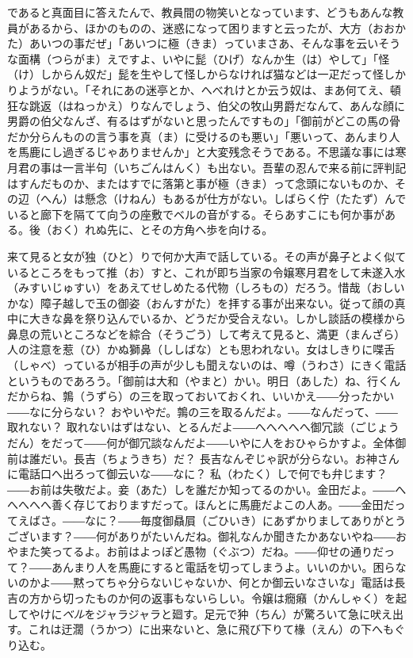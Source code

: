 \documentclass{book}
\begin{document}
であると真面目に答えたんで、教員間の物笑いとなっています、どうもあんな教員があるから、ほかのものの、迷惑になって困りますと云ったが、大方（おおかた）あいつの事だぜ」「あいつに極（きま）っていまさあ、そんな事を云いそうな面構（つらがま）えですよ、いやに髭（ひげ）なんか生（は）やして」「怪（け）しからん奴だ」髭を生やして怪しからなければ猫などは一疋だって怪しかりようがない。「それにあの迷亭とか、へべれけとか云う奴は、まあ何てえ、頓狂な跳返（はねっかえ）りなんでしょう、伯父の牧山男爵だなんて、あんな顔に男爵の伯父なんざ、有るはずがないと思ったんですもの」「御前がどこの馬の骨だか分らんものの言う事を真（ま）に受けるのも悪い」「悪いって、あんまり人を馬鹿にし過ぎるじゃありませんか」と大変残念そうである。不思議な事には寒月君の事は一言半句（いちごんはんく）も出ない。吾輩の忍んで来る前に評判記はすんだものか、またはすでに落第と事が極（きま）って念頭にないものか、その辺（へん）は懸念（けねん）もあるが仕方がない。しばらく佇（たたず）んでいると廊下を隔てて向うの座敷でベルの音がする。そらあすこにも何か事がある。後（おく）れぬ先に、とその方角へ歩を向ける。

来て見ると女が独（ひと）りで何か大声で話している。その声が鼻子とよく似ているところをもって推（お）すと、これが即ち当家の令嬢寒月君をして未遂入水（みすいじゅすい）をあえてせしめたる代物（しろもの）だろう。惜哉（おしいかな）障子越しで玉の御姿（おんすがた）を拝する事が出来ない。従って顔の真中に大きな鼻を祭り込んでいるか、どうだか受合えない。しかし談話の模様から鼻息の荒いところなどを綜合（そうごう）して考えて見ると、満更（まんざら）人の注意を惹（ひ）かぬ獅鼻（ししばな）とも思われない。女はしきりに喋舌（しゃべ）っているが相手の声が少しも聞えないのは、噂（うわさ）にきく電話というものであろう。「御前は大和（やまと）かい。明日（あした）ね、行くんだからね、鶉（うずら）の三を取っておいておくれ、いいかえ――分ったかい――なに分らない？ おやいやだ。鶉の三を取るんだよ。――なんだって、――取れない？ 取れないはずはない、とるんだよ――へへへへへ御冗談（ごじょうだん）をだって――何が御冗談なんだよ――いやに人をおひゃらかすよ。全体御前は誰だい。長吉（ちょうきち）だ？ 長吉なんぞじゃ訳が分らない。お神さんに電話口へ出ろって御云いな――なに？ 私（わたく）しで何でも弁じます？――お前は失敬だよ。妾（あた）しを誰だか知ってるのかい。金田だよ。――へへへへへ善く存じておりますだって。ほんとに馬鹿だよこの人あ。――金田だってえばさ。――なに？――毎度御贔屓（ごひいき）にあずかりましてありがとうございます？――何がありがたいんだね。御礼なんか聞きたかあないやね――おやまた笑ってるよ。お前はよっぽど愚物（ぐぶつ）だね。――仰せの通りだって？――あんまり人を馬鹿にすると電話を切ってしまうよ。いいのかい。困らないのかよ――黙ってちゃ分らないじゃないか、何とか御云いなさいな」電話は長吉の方から切ったものか何の返事もないらしい。令嬢は癇癪（かんしゃく）を起してやけに\emph{ベル}をジャラジャラと廻す。足元で狆（ちん）が驚ろいて急に吠え出す。これは迂濶（うかつ）に出来ないと、急に飛び下りて椽（えん）の下へもぐり込む。
\end{document}
